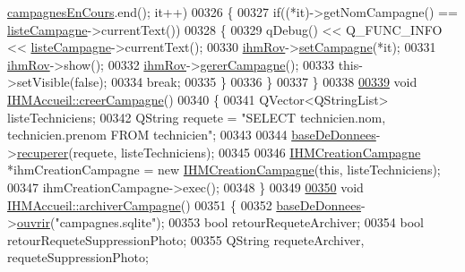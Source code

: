 \begin{DoxyCode}
{      \hyperlink{class_i_h_m_accueil_ad3827b81480eb201b5927c16a2ad1c46}{campagnesEnCours}.end(); it++)
00326     \{
00327         \textcolor{keywordflow}{if}((*it)->getNomCampagne() == \hyperlink{class_i_h_m_accueil_afb828a4e06c25afa40341c310cd85b08}{listeCampagne}->currentText())
00328         \{
00329             qDebug() << Q\_FUNC\_INFO << \hyperlink{class_i_h_m_accueil_afb828a4e06c25afa40341c310cd85b08}{listeCampagne}->currentText();
00330             \hyperlink{class_i_h_m_accueil_af9f2613056b21bdf82e8f54a26146acc}{ihmRov}->\hyperlink{class_i_h_m_rov_a301a0b8cb323c2c9de71df9070bb7555}{setCampagne}(*it);
00331             \hyperlink{class_i_h_m_accueil_af9f2613056b21bdf82e8f54a26146acc}{ihmRov}->show();
00332             \hyperlink{class_i_h_m_accueil_af9f2613056b21bdf82e8f54a26146acc}{ihmRov}->\hyperlink{class_i_h_m_rov_a3660d3b4bf61367534eae9d0c3618a5e}{gererCampagne}();
00333             this->setVisible(\textcolor{keyword}{false});
00334             \textcolor{keywordflow}{break};
00335         \}
00336     \}    
00337 \}
00338 
\hyperlink{class_i_h_m_accueil_a1da45b17d6e4198f87a9a0e05d1f7fd5}{00339} \textcolor{keywordtype}{void} \hyperlink{class_i_h_m_accueil_a1da45b17d6e4198f87a9a0e05d1f7fd5}{IHMAccueil::creerCampagne}()
00340 \{
00341     QVector<QStringList> listeTechniciens;
00342     QString requete = \textcolor{stringliteral}{"SELECT technicien.nom, technicien.prenom FROM technicien"};
00343 
00344     \hyperlink{class_i_h_m_accueil_ab56d9846c071396a92f88272880e2c1f}{baseDeDonnees}->\hyperlink{class_base_de_donnees_a77539baad389f5acf754cd2cd452403e}{recuperer}(requete, listeTechniciens);
00345 
00346     \hyperlink{class_i_h_m_creation_campagne}{IHMCreationCampagne} *ihmCreationCampagne = \textcolor{keyword}{new} 
      \hyperlink{class_i_h_m_creation_campagne}{IHMCreationCampagne}(\textcolor{keyword}{this}, listeTechniciens);
00347     ihmCreationCampagne->exec();
00348 \}
00349 
\hyperlink{class_i_h_m_accueil_a5d38917dbe88751ee966834e1f6c558e}{00350} \textcolor{keywordtype}{void} \hyperlink{class_i_h_m_accueil_a5d38917dbe88751ee966834e1f6c558e}{IHMAccueil::archiverCampagne}()
00351 \{
00352     \hyperlink{class_i_h_m_accueil_ab56d9846c071396a92f88272880e2c1f}{baseDeDonnees}->\hyperlink{class_base_de_donnees_a7f6a5510b08017b0d99115a84252f186}{ouvrir}(\textcolor{stringliteral}{"campagnes.sqlite"});
00353     \textcolor{keywordtype}{bool} retourRequeteArchiver;
00354     \textcolor{keywordtype}{bool} retourRequeteSuppressionPhoto;
00355     QString requeteArchiver, requeteSuppressionPhoto;
}
\end{DoxyCode}
